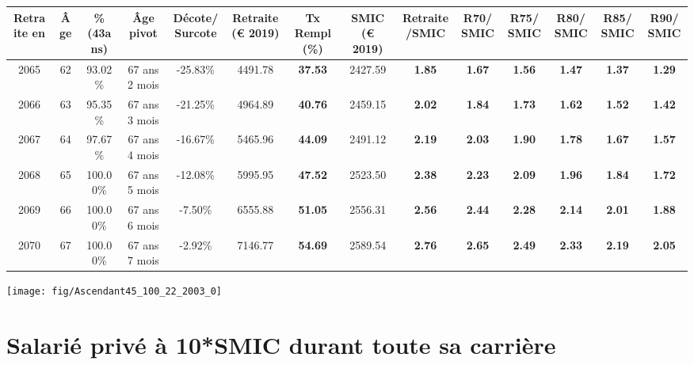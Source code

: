 \begin{adjustbox}{max width=\textwidth} 
\begin{tabular}[htb]{|c|c||c|c|c||c|c||c|c||c|c|c|c|c|} 
\hline 
 Retraite en &  Âge &  \%(43ans) &  Âge pivot &  Décote/Surcote &  Retraite (\euro{} 2019) &  Tx Rempl(\%) &  SMIC (\euro{} 2019) &  Retraite/SMIC &  R70/SMIC &  R75/SMIC &  R80/SMIC &  R85/SMIC &  R90/SMIC \\ 
\hline \hline 
 2065 &  62 &  93.02\% &  67 ans 2 mois &  -25.83\% &  4491.78 &  {\bf 37.53} &  2427.59 &  {\bf 1.85} &  {\bf 1.67} &  {\bf 1.56} &  {\bf 1.47} &  {\bf 1.37} &  {\bf 1.29} \\ 
\hline 
 2066 &  63 &  95.35\% &  67 ans 3 mois &  -21.25\% &  4964.89 &  {\bf 40.76} &  2459.15 &  {\bf 2.02} &  {\bf 1.84} &  {\bf 1.73} &  {\bf 1.62} &  {\bf 1.52} &  {\bf 1.42} \\ 
\hline 
 2067 &  64 &  97.67\% &  67 ans 4 mois &  -16.67\% &  5465.96 &  {\bf 44.09} &  2491.12 &  {\bf 2.19} &  {\bf 2.03} &  {\bf 1.90} &  {\bf 1.78} &  {\bf 1.67} &  {\bf 1.57} \\ 
\hline 
 2068 &  65 &  100.00\% &  67 ans 5 mois &  -12.08\% &  5995.95 &  {\bf 47.52} &  2523.50 &  {\bf 2.38} &  {\bf 2.23} &  {\bf 2.09} &  {\bf 1.96} &  {\bf 1.84} &  {\bf 1.72} \\ 
\hline 
 2069 &  66 &  100.00\% &  67 ans 6 mois &  -7.50\% &  6555.88 &  {\bf 51.05} &  2556.31 &  {\bf 2.56} &  {\bf 2.44} &  {\bf 2.28} &  {\bf 2.14} &  {\bf 2.01} &  {\bf 1.88} \\ 
\hline 
 2070 &  67 &  100.00\% &  67 ans 7 mois &  -2.92\% &  7146.77 &  {\bf 54.69} &  2589.54 &  {\bf 2.76} &  {\bf 2.65} &  {\bf 2.49} &  {\bf 2.33} &  {\bf 2.19} &  {\bf 2.05} \\ 
\hline 
\hline 
\end{tabular} 
\end{adjustbox} 
 
 \vspace{0.1cm} 

 {\hspace{-2.2cm}\texttt{[image: fig/Ascendant45\_100\_22\_2003\_0]}} 

\newpage 
 
\chapter{Salarié privé à 10*SMIC durant toute sa carrière} 

~\\ 
 
